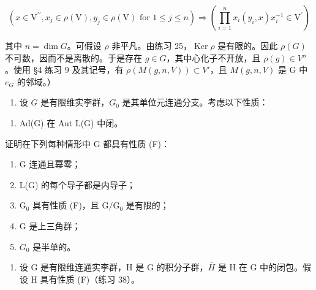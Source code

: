 \[
(x \in \mathrm{V} ^ {\prime \prime}, x _ {j} \in \rho (\mathrm{V}), y _ {j} \in \rho (\mathrm{V}) \text {   for   } 1 \leqslant j \leqslant n) \Rightarrow \left(\prod_ {i = 1} ^ {n} x _ {i} (y _ {i}, x) x _ {i} ^ {- 1} \in \mathrm{V} ^ {\prime}\right)
\]

其中 \(n = \dim G\)。可假设 \(\rho\) 非平凡。由练习 25，\(\operatorname{Ker} \rho\) 是有限的。因此 \(\rho(G)\) 不可数，因而不是离散的。于是存在 \(g \in G\)，其中心化子不开放，且 \(\rho(g) \in V''\)。使用 §4 练习 9 及其记号，有 \(\rho(M(g, n, V)) \subset V'\)，且 \(M(g, n, V)\) 是 G 中 \(e_G\) 的邻域。）

\begin{enumerate}
\def\labelenumi{\arabic{enumi}.}
\setcounter{enumi}{37}
\tightlist
\item
  设 \(G\) 是有限维实李群，\(G_0\) 是其单位元连通分支。考虑以下性质：
\end{enumerate}

\begin{enumerate}
\def\labelenumi{(\Alph{enumi})}
\setcounter{enumi}{5}
\tightlist
\item
  Ad(G) 在 Aut L(G) 中闭。
\end{enumerate}

证明在下列每种情形中 G 都具有性质 (F)：

\begin{enumerate}
\def\labelenumi{(\roman{enumi})}
\item
  G 连通且幂零；
\item
  L(G) 的每个导子都是内导子；
\item
  \(\mathrm{G}_0\) 具有性质 (F)，且 \(\mathrm{G} / \mathrm{G}_0\) 是有限的；
\item
  G 是上三角群；
\item
  \(G_{0}\) 是半单的。
\end{enumerate}

\begin{enumerate}
\def\labelenumi{\arabic{enumi}.}
\setcounter{enumi}{38}
\tightlist
\item
  设 G 是有限维连通实李群，H 是 G 的积分子群，\(\bar{H}\) 是 H 在 G 中的闭包。假设 H 具有性质 (F)（练习 38）。
\end{enumerate}

